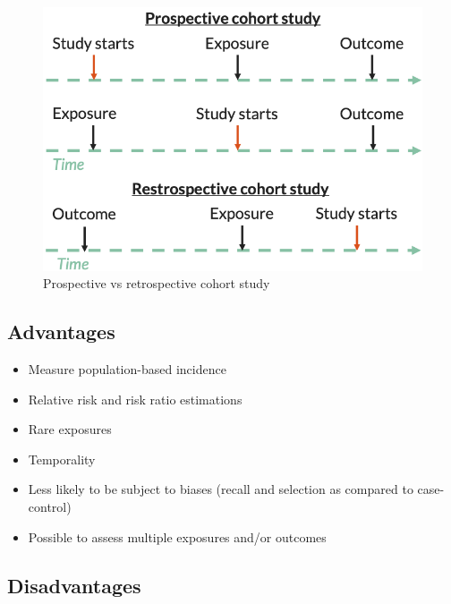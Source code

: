 \documentclass[
]{book}
\providecommand{\tightlist}{%
  \setlength{\itemsep}{0pt}\setlength{\parskip}{0pt}}
\begin{document}
\begin{figure}

{\centering \includegraphics[width=1\linewidth]{img/study_design/ret_vs_pros_cohort} 

}

\caption{Prospective vs retrospective cohort study}\label{fig:unnamed-chunk-9}
\end{figure}

\hypertarget{advantages-2}{%
\subsection{Advantages}\label{advantages-2}}

\begin{itemize}
\tightlist
\item
  Measure population-based incidence
\item
  Relative risk and risk ratio estimations
\item
  Rare exposures
\item
  Temporality
\item
  Less likely to be subject to biases (recall and selection as compared to case-control)
\item
  Possible to assess multiple exposures and/or outcomes
\end{itemize}

\hypertarget{disadvantages-1}{%
\subsection{Disadvantages}\label{disadvantages-1}}
\end{document}
